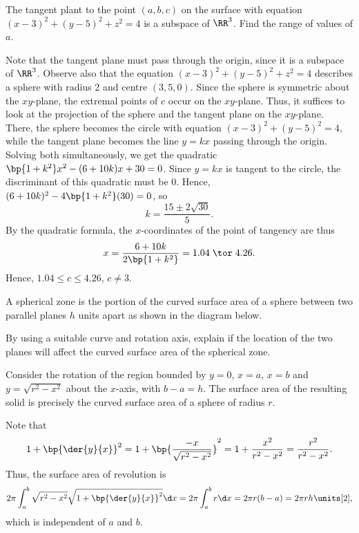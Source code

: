 \begin{problem}
    The tangent plant to the point $(a, b, c)$ on the surface with equation $(x-3)^2 + (y-5)^2 + z^2 = 4$ is a subspace of $\RR^3$. Find the range of values of $a$.
\end{problem}
\begin{solution}
    Note that the tangent plane must pass through the origin, since it is a subspace of $\RR^3$. Observe also that the equation $(x-3)^2 + (y-5)^2 + z^2 = 4$ describes a sphere with radius 2 and centre $(3, 5, 0)$. Since the sphere is symmetric about the $xy$-plane, the extremal points of $c$ occur on the $xy$-plane. Thus, it suffices to look at the projection of the sphere and the tangent plane on the $xy$-plane. There, the sphere becomes the circle with equation $(x-3)^2 + (y-5)^2 = 4$, while the tangent plane becomes the line $y = kx$ passing through the origin. Solving both simultaneously, we get the quadratic $\bp{1 + k^2} x^2 - (6 + 10k)x + 30 = 0$. Since $y = kx$ is tangent to the circle, the discriminant of this quadratic must be 0. Hence, $(6 + 10k)^2 - 4\bp{1 + k^2}(30) = 0$, so \[k = \frac{15 \pm 2\sqrt{30}}{5}.\] By the quadratic formula, the $x$-coordinates of the point of tangency are thus \[x = \frac{6+10k}{2\bp{1 + k^2}} = 1.04 \; \tor \; 4.26.\] Hence, $1.04 \leq c \leq 4.26$, $c \neq 3$.
\end{solution}

\clearpage
\begin{problem}
    A spherical zone is the portion of the curved surface area of a sphere between two parallel planes $h$ units apart as shown in the diagram below.

    \begin{figure}[H]
        \centering
    \end{figure}

    By using a suitable curve and rotation axis, explain if the location of the two planes will affect the curved surface area of the spherical zone.
\end{problem}
\begin{solution}
    Consider the rotation of the region bounded by $y = 0$, $x = a$, $x = b$ and $y = \sqrt{r^2 - x^2}$ about the $x$-axis, with $b-a = h$. The surface area of the resulting solid is precisely the curved surface area of a sphere of radius $r$.

    Note that \[1 + \bp{\der{y}{x}}^2 = 1 + \bp{\frac{-x}{\sqrt{r^2-x^2}}}^2 = 1 + \frac{x^2}{r^2 - x^2} = \frac{r^2}{r^2-x^2}.\] Thus, the surface area of revolution is \[2\pi \int_a^b \sqrt{r^2 - x^2} \sqrt{1 + \bp{\der{y}{x}}^2} \d x = 2\pi \int_a^b r \d x = 2\pi r (b-a) = 2\pi r h \units[2],\] which is independent of $a$ and $b$.
\end{solution}

